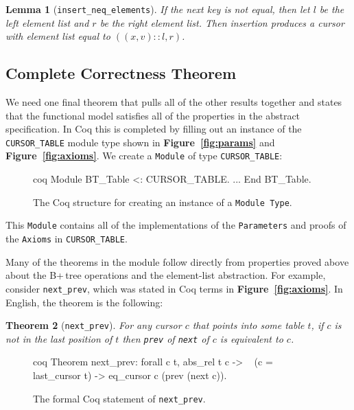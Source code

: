 \documentclass[12pt]{article}
\newtheorem{theorem}{Theorem}
\newtheorem{lemma}[theorem]{Lemma}
\begin{document}
\begin{lemma}[\texttt{insert\_neq\_elements}]
If the next key is not equal, then let $l$ be the left element list and $r$ be the right element list. Then insertion produces a cursor with element list equal to $((x,v)::l,r)$.
\end{lemma}

\subsection{Complete Correctness Theorem}

We need one final theorem that pulls all of the other results together and states that the functional model satisfies all of the properties in the abstract specification. In Coq this is completed by filling out an instance of the \texttt{CURSOR\_TABLE} module type shown in \textbf{Figure~\ref{fig:params}} and \textbf{Figure~\ref{fig:axioms}}. We create a \texttt{Module} of type \texttt{CURSOR\_TABLE}:

\begin{singlespace}
\begin{figure}[ht]
\centering
\begin{cminted}{coq}
Module BT_Table <: CURSOR_TABLE.
 ...
End BT_Table.
\end{cminted}
\caption{The Coq structure for creating an instance of a \texttt{Module Type}.}
\end{figure}
\end{singlespace}

This \texttt{Module} contains all of the implementations of the \texttt{Parameters} and proofs of the \texttt{Axioms} in \texttt{CURSOR\_TABLE}.

Many of the theorems in the module follow directly from properties proved above about the B+\,tree operations and the element-list abstraction. For example, consider \texttt{next\_prev}, which was stated in Coq terms in \textbf{Figure~\ref{fig:axioms}}. In English, the theorem is the following:

\begin{theorem}[\texttt{next\_prev}]
For any cursor $c$ that points into some table $t$, if $c$ is not in the last position of $t$ then \texttt{prev} of \texttt{next} of $c$ is equivalent to $c$.
\end{theorem}

\begin{singlespace}
\begin{figure}[ht]
\centering
\begin{cminted}{coq}
Theorem next_prev: forall c t,
   abs_rel t c -> ~ (c = last_cursor t) -> eq_cursor c (prev (next c)).
\end{cminted}
\caption{The formal Coq statement of \texttt{next\_prev}.}
\end{figure}
\end{singlespace}
\end{document}
